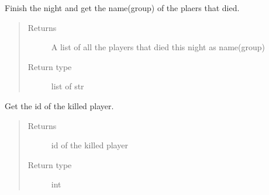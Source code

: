 \documentclass[letterpaper,10pt,english]{sphinxmanual}
\begin{document}
\begin{fulllineitems}
\begin{fulllineitems}
\begin{quote}
\begin{description}
\end{description}\end{quote}

\end{fulllineitems}


\begin{fulllineitems}
\label{\detokenize{chatwolf:chatwolf.nightactions.Nightactions.finish_night}}
Finish the night and get the name(group) of the plaers that died.
\begin{quote}\begin{description}
\item[{Returns}] \leavevmode
A list of all the players that died this night as name(group)

\item[{Return type}] \leavevmode
list of str

\end{description}\end{quote}

\end{fulllineitems}


\begin{fulllineitems}
\label{\detokenize{chatwolf:chatwolf.nightactions.Nightactions.get_killed_id}}
Get the id of the killed player.
\begin{quote}\begin{description}
\item[{Returns}] \leavevmode
id of the killed player

\item[{Return type}] \leavevmode
int

\end{description}\end{quote}

\end{fulllineitems}



\end{fulllineitems}
\end{document}
